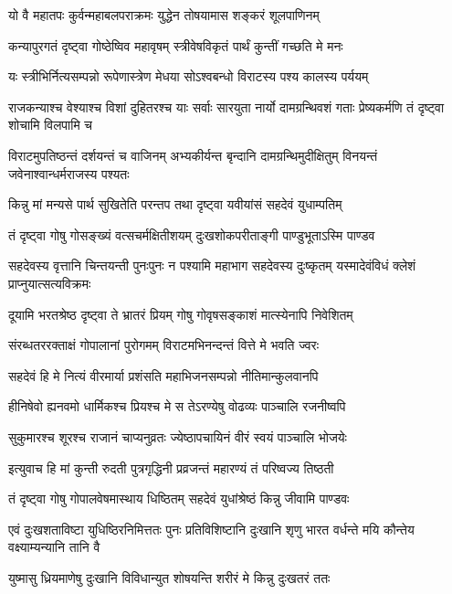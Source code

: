 \twolineshloka
{यो वै महातपः कुर्वन्महाबलपराक्रमः}
{युद्धेन तोषयामास शङ्करं शूलपाणिनम्}


\twolineshloka
{कन्यापुरगतं दृष्ट्वा गोष्ठेष्विव महावृषम्}
{स्त्रीवेषविकृतं पार्थं कुन्तीं गच्छति मे मनः}


\twolineshloka
{यः स्त्रीभिर्नित्यसम्पन्नो रूपेणास्त्रेण मेधया}
{सोऽश्वबन्धो विराटस्य पश्य कालस्य पर्ययम्}


\threelineshloka
{राजकन्याश्च वेश्याश्च विशां दुहितरश्च याः}
{सर्वाः सारयुता नार्यो दामग्रन्थिवशं गताः}
{प्रेष्यकर्मणि तं दृष्ट्वा शोचामि विलपामि च}


\threelineshloka
{विराटमुपतिष्ठन्तं दर्शयन्तं च वाजिनम्}
{अभ्यकीर्यन्त बृन्दानि दामग्रन्थिमुदीक्षितुम्}
{विनयन्तं जवेनाश्वान्धर्मराजस्य पश्यतः}


\twolineshloka
{किन्नु मां मन्यसे पार्थ सुखितेति परन्तप}
{तथा दृष्ट्वा यवीयांसं सहदेवं युधाम्पतिम्}


\twolineshloka
{तं दृष्ट्वा गोषु गोसङ्ख्यं वत्सचर्मक्षितीशयम्}
{दुःखशोकपरीताङ्गी पाण्डुभूताऽस्मि पाण्डव}


\threelineshloka
{सहदेवस्य वृत्तानि चिन्तयन्ती पुनःपुनः}
{न पश्यामि महाभाग सहदेवस्य दुःष्कृतम्}
{यस्मादेवंविधं क्लेशं प्राप्नुयात्सत्यविक्रमः}


\twolineshloka
{दूयामि भरतश्रेष्ठ दृष्ट्वा ते भ्रातरं प्रियम्}
{गोषु गोवृषसङ्काशं मात्स्येनापि निवेशितम्}


\twolineshloka
{संरब्धतररक्ताक्षं गोपालानां पुरोगमम्}
{विराटमभिनन्दन्तं वित्ते मे भवति ज्वरः}


\twolineshloka
{सहदेवं हि मे नित्यं वीरमार्या प्रशंसति}
{महाभिजनसम्पन्नो नीतिमान्कुलवानपि}


\twolineshloka
{हीनिषेवो ह्यनवमो धार्मिकश्च प्रियश्च मे}
{स तेऽरण्येषु वोढव्यः पाञ्चालि रजनीष्वपि}


\twolineshloka
{सुकुमारश्च शूरश्च राजानं चाप्यनुव्रतः}
{ज्येष्ठापचायिनं वीरं स्वयं पाञ्चालि भोजयेः}


\twolineshloka
{इत्युवाच हि मां कुन्ती रुदती पुत्रगृद्धिनी}
{प्रव्रजन्तं महारण्यं तं परिष्वज्य तिष्ठती}


\twolineshloka
{तं दृष्ट्वा गोषु गोपालवेषमास्थाय धिष्ठितम्}
{सहदेवं युधांश्रेष्ठं किन्नु जीवामि पाण्डवः}


\onelineshloka
{एवं दुःखशताविष्टा युधिष्ठिरनिमित्ततः}
\twolineshloka
{पुनः प्रतिविशिष्टानि दुःखानि शृणु भारत}
{वर्धन्ते मयि कौन्तेय वक्ष्याम्यन्यानि तानि वै}


\twolineshloka
{युष्मासु ध्रियमाणेषु दुःखानि विविधान्युत}
{शोषयन्ति शरीरं मे किन्नु दुःखतरं ततः}


